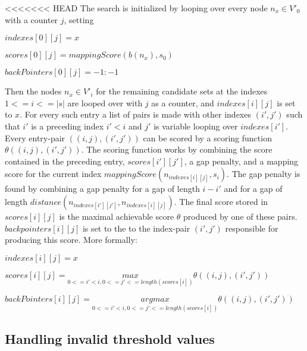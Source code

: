 \documentclass{article}
\begin{document}
<<<<<<< HEAD
The search is initialized by looping over every node $n_x \in V'_0$ with a counter $j$, setting\\
\par
$indexes[0][j] = x$\par
$scores[0][j] = mappingScore(b(n_x), s_0)$\par
$backPointers[0][j] = -1:-1$\\
\par\noindent
Then the nodes $n_x \in V'_i$ for the remaining candidate sets at the indexes $1<=i<=|s|$ are looped over with $j$ as a counter, and $indexes[i][j]$ is set to $x$. For every such entry a list of pairs is made with other indexes $(i', j')$ such that $i'$ is a preceding index $i'<i$ and $j'$ is variable looping over $indexes[i']$. Every entry-pair $((i, j), (i', j'))$ can be scored by a scoring function $\theta((i, j), (i', j'))$. The scoring function works by combining the score contained in the preceding entry, $scores[i'][j']$, a gap penalty, and a mapping score for the current index $mappingScore(n_{indexes[i][j]}, s_i)$. The gap penalty is found by combining a gap penalty for a gap of length $i-i'$ and for a gap of length $distance(n_{indexes[i'][j']}, n_{indexes[i][j]})$. The final score stored in $scores[i][j]$ is the maximal achievable score $\theta$ produced by one of these pairs. $backpointers[i][j]$ is set to the to the index-pair $(i', j')$ responsible for producing this score. More formally:\\
\par
$indexes[i][j] = x$\par
$scores[i][j] = \underset{0<=i'<i, 0<=j'<=length(scores[i])}{max}\theta((i, j), (i', j'))$\par
$backPointers[i][j] = \underset{0<=i'<i, 0<=j'<=length(scores[i])}{arg max}\theta((i, j), (i', j'))$\par
\subsection{Handling invalid threshold values}
\end{document}
